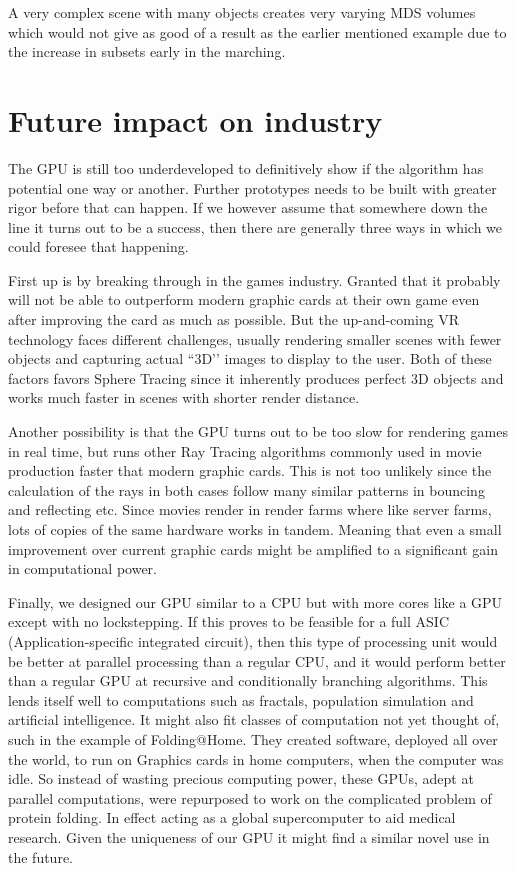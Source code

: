 			A very complex scene with many objects creates very varying MDS
			volumes which would not give as good of a result as the earlier
			mentioned example due to the increase in subsets early in the
			marching.

	\section{Future impact on industry} 

		The GPU is still too underdeveloped to definitively show if the
		algorithm has potential one way or another.  Further prototypes needs
		to be built with greater rigor before that can happen. If we however
		assume that somewhere down the line it turns out to be a success,
		then there are generally three ways in which we could foresee that
		happening.
		
		First up is by breaking through in the games industry. Granted that
		it probably will not be able to outperform modern graphic cards at
		their own game even after improving the card as much as possible. But
		the up-and-coming VR technology faces different challenges, usually
		rendering smaller scenes with fewer objects and capturing actual
		``3D’’ images to display to the user. Both of these factors favors
		Sphere Tracing since it inherently produces perfect 3D objects and
		works much faster in scenes with shorter render distance.
		
		Another possibility is that the GPU turns out to be too slow for
		rendering games in real time, but runs other Ray Tracing algorithms
		commonly used in movie production faster that modern graphic cards.
		This is not too unlikely since the calculation of the rays in both
		cases follow many similar patterns in bouncing and reflecting etc.
		Since movies render in render farms where like server farms, lots of
		copies of the same hardware works in tandem. Meaning that even a
		small improvement over current graphic cards might be amplified to a
		significant gain in computational power.
		
		Finally, we designed our GPU similar to a CPU but with more	cores
		like a GPU except with no lockstepping. If this proves to be feasible
		for a full ASIC (Application-specific integrated circuit), then this
		type of processing unit would be better at parallel processing than a
		regular CPU, and it would perform better than a regular GPU at
		recursive and conditionally branching algorithms. This lends itself
		well to computations such as fractals, population simulation and
		artificial intelligence. It might also fit classes of computation not
		yet thought of, such in the example of Folding@Home\cite{Beberg2009}.
		They created software, deployed all over the world, to run on
		Graphics cards in home computers, when the computer was idle. So
		instead of wasting precious computing power, these GPUs, adept at
		parallel computations, were repurposed to work on the complicated
		problem of protein folding. In effect acting as a global
		supercomputer to aid medical research. Given the uniqueness of our
		GPU it might find a similar novel use in the future.
